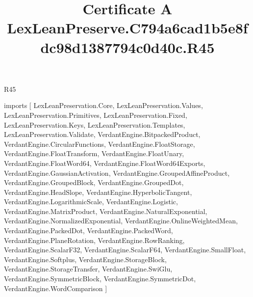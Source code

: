 \begin{lexlean}{R45}
\title{Certificate A LexLeanPreserve.C794a6cad1b5e8fdc98d1387794c0d40c.R45}
\begin{coremodule}
imports [
  LexLeanPreservation.Core,
  LexLeanPreservation.Values,
  LexLeanPreservation.Primitives,
  LexLeanPreservation.Fixed,
  LexLeanPreservation.Keys,
  LexLeanPreservation.Templates,
  LexLeanPreservation.Validate,
  VerdantEngine.BitpackedProduct,
  VerdantEngine.CircularFunctions,
  VerdantEngine.FloatStorage,
  VerdantEngine.FloatTransform,
  VerdantEngine.FloatUnary,
  VerdantEngine.FloatWord64,
  VerdantEngine.FloatWord64Exports,
  VerdantEngine.GaussianActivation,
  VerdantEngine.GroupedAffineProduct,
  VerdantEngine.GroupedBlock,
  VerdantEngine.GroupedDot,
  VerdantEngine.HeadSlope,
  VerdantEngine.HyperbolicTangent,
  VerdantEngine.LogarithmicScale,
  VerdantEngine.Logistic,
  VerdantEngine.MatrixProduct,
  VerdantEngine.NaturalExponential,
  VerdantEngine.NormalizedExponential,
  VerdantEngine.OnlineWeightedMean,
  VerdantEngine.PackedDot,
  VerdantEngine.PackedWord,
  VerdantEngine.PlaneRotation,
  VerdantEngine.RowRanking,
  VerdantEngine.ScalarF32,
  VerdantEngine.ScalarF64,
  VerdantEngine.SmallFloat,
  VerdantEngine.Softplus,
  VerdantEngine.StorageBlock,
  VerdantEngine.StorageTransfer,
  VerdantEngine.SwiGlu,
  VerdantEngine.SymmetricBlock,
  VerdantEngine.SymmetricDot,
  VerdantEngine.WordComparison
]


\end{coremodule}
\end{lexlean}
